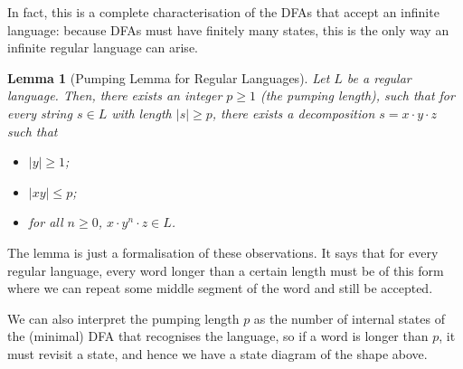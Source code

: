 \documentclass{article}
\newtheorem*{lemma*}{Lemma}
\theoremstyle{definition}
\theoremstyle{definition}
\theoremstyle{remark}
\begin{document}
In fact, this is a complete characterisation of the DFAs that accept an infinite language: because DFAs must have finitely many states, this is the only way an infinite regular language can arise.

\begin{lemma*}[Pumping Lemma for Regular Languages]
    Let $L$ be a regular language. Then, there exists an integer $p\geq 1$ (the \textit{pumping length}), such that for every string $s\in L$ with length $|s|\geq p$, there exists a decomposition $s=x\cdot y\cdot z$ such that
    \begin{itemize}
        \item $|y|\geq1$;
        \item $|xy|\leq p$;
        \item for all $n\geq0$, $x\cdot y^n\cdot z\in L$.
    \end{itemize}
\end{lemma*}

The lemma is just a formalisation of these observations. It says that for every regular language, every word longer than a certain length must be of this form where we can repeat some middle segment of the word and still be accepted.

We can also interpret the pumping length $p$ as the number of internal states of the (minimal) DFA that recognises the language, so if a word is longer than $p$, it must revisit a state, and hence we have a state diagram of the shape above.
\end{document}
